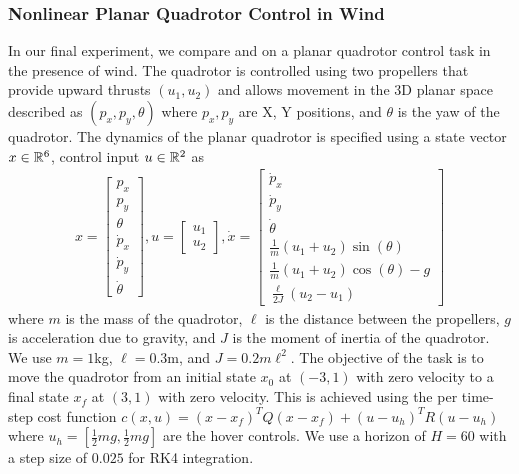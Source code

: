 \subsubsection{Nonlinear Planar Quadrotor Control in Wind}
\label{sec:nonl-plan-quadr-1}

In our final experiment, we compare \MM{} and \ILC{} on a planar quadrotor control
task in the presence of wind. The quadrotor is controlled using two propellers
that provide upward
thrusts $(u_{1}, u_{2})$ and allows movement in the $3$D planar space
described as
$(p_{x}, p_{y}, \theta)$ where $p_{x}, p_{y}$ are X, Y positions, and
$\theta$ is the yaw of the quadrotor. The dynamics of the planar quadrotor
is specified
using a state vector $x \in \mathbb{R}^{6}$, control input $u \in \mathbb{R}^{2}$ as
\begin{align*}
  x =
  \begin{bmatrix}
    p_{x} \\ p_{y} \\ \theta \\ \dot{p}_{x} \\ \dot{p}_{y} \\ \dot{\theta}
  \end{bmatrix}, u =
  \begin{bmatrix}
    u_{1} \\ u_{2}
  \end{bmatrix},
  \dot{x} =
  \begin{bmatrix}
    \dot{p}_{x} \\ \dot{p}_{y} \\ \dot{\theta} \\ \frac{1}{m}(u_{1} + u_{2})\sin(\theta) \\ \frac{1}{m}(u_{1} + u_{2})\cos(\theta) - g \\ \frac{\ell}{2J}(u_{2} - u_{1})
  \end{bmatrix}
\end{align*}
where $m$ is the mass of the quadrotor, $\ell$ is the distance between the
propellers, $g$ is acceleration due to gravity, and $J$ is the moment of
inertia of the quadrotor. We use $m = 1$kg, $\ell = 0.3$m, and
$J = 0.2m\ell^{2}$. The objective of the task is to move the quadrotor from an initial
state $x_0$
at $(-3, 1)$ with zero velocity to a final state $x_f$ at $(3, 1)$ with zero
velocity. This is achieved using the per time-step cost function
$c(x, u) = (x - x_{f})^{T}Q(x - x_{f}) + (u - u_{h})^{T}R(u - u_{h})$
where $u_{h} = [\frac{1}{2}mg, \frac{1}{2}mg]$ are the hover controls. We use a
horizon of $H = 60$ with a step size of $0.025$ for RK4 integration.

